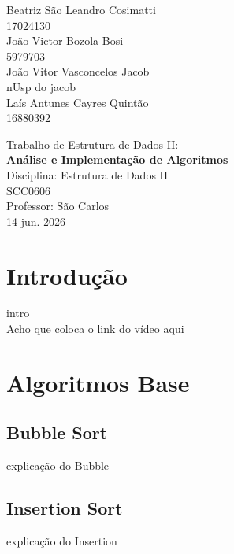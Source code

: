 \documentclass{article}
\begin{document}
\begin{titlepage}
    \centering
    \vspace*{2cm}
    {\large
    Beatriz São Leandro Cosimatti\\
    17024130\\
    João Victor Bozola Bosi\\
    5979703\\
    João Vitor Vasconcelos Jacob\\
    nUsp do jacob\\
    Laís Antunes Cayres Quintão\\
    16880392\\ 
    }
    \vspace{2cm}
    \vspace{3cm}
    
    {\Large {Trabalho de Estrutura de Dados II:\\}}
    {\Large \textbf{Análise e Implementação de Algoritmos\\}}
    \vspace{3cm}
    {\large
    Disciplina: Estrutura de Dados II\\
    SCC0606\\
    Professor: 
    }
    \vfill
    {\large
    São Carlos\\
    {14 jun. 2026}
    }
\end{titlepage}


\section{Introdução}
intro\\
Acho que coloca o link do vídeo aqui

\newpage

\section{Algoritmos Base}

    \subsection{Bubble Sort}
    explicação do Bubble


    \subsection{Insertion Sort}
    explicação do Insertion
\end{document}
